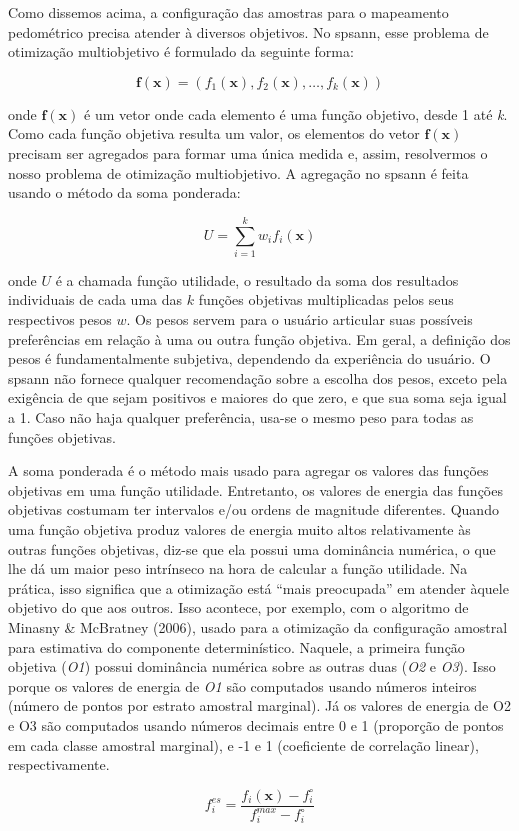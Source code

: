 Como dissemos acima, a configuração das amostras para o mapeamento pedométrico precisa atender à diversos objetivos. No spsann, esse problema de otimização multiobjetivo é formulado da seguinte forma:

\begin{equation}
\label{eqn:multiobjetivo}
\mathbf{f}(\mathbf{x}) = (f_1(\mathbf{x}), f_2(\mathbf{x}), 
                          \ldots, f_k(\mathbf{x}))
\end{equation}

onde $\mathbf{f}(\mathbf{x})$ é um vetor onde cada elemento é uma função
objetivo, desde 1 até \textit{k}. Como cada função objetiva resulta um valor, os elementos do vetor $\mathbf{f}(\mathbf{x})$ precisam ser agregados para formar uma única medida e, assim, resolvermos o nosso problema de otimização multiobjetivo. A agregação no spsann é feita usando o método da soma ponderada:

\begin{equation}
\label{eqn:soma}
U = \sum_{i=1}^{k} w_if_i(\mathbf{x})
\end{equation}

onde $U$ é a chamada função utilidade, o resultado da soma dos resultados individuais de cada uma das $k$ funções objetivas multiplicadas pelos seus respectivos pesos $w$. Os pesos servem para o usuário articular suas possíveis preferências em relação à uma ou outra função objetiva. Em geral, a definição dos pesos é fundamentalmente subjetiva, dependendo da experiência do usuário. O spsann não fornece qualquer recomendação sobre a escolha dos pesos, exceto pela exigência de que sejam positivos e maiores do que zero, e que sua soma seja igual a 1. Caso não haja qualquer preferência, usa-se o mesmo peso para todas as funções objetivas.

A soma ponderada é o método mais usado para agregar os valores das funções objetivas em uma função utilidade. Entretanto, os valores de energia das funções objetivas costumam ter intervalos e/ou ordens de magnitude diferentes. Quando uma função objetiva produz valores de energia muito altos relativamente às outras funções objetivas, diz-se que ela possui uma dominância numérica, o que lhe dá um maior peso intrínseco na hora de calcular a função utilidade. Na prática, isso significa que a otimização está “mais preocupada” em atender àquele objetivo do que aos outros. Isso acontece, por exemplo, com o algoritmo de Minasny & McBratney (2006), usado para a otimização da configuração amostral para estimativa do componente determinístico. Naquele, a primeira função objetiva (\textit{O1}) possui dominância numérica sobre as outras duas (\textit{O2} e \textit{O3}). Isso porque os valores de energia de \textit{O1} são computados usando números inteiros (número de pontos por estrato amostral marginal). Já os valores de energia de O2 e O3 são computados usando números decimais entre 0 e 1 (proporção de pontos em cada classe amostral marginal), e -1 e 1 (coeficiente de correlação linear), respectivamente.

\begin{equation}
\label{eqn:escalonamento}
f^{es}_i = \frac{f_i(\mathbf{x}) - f^\circ_i}{f^{max}_i - f^\circ_i}
\end{equation}